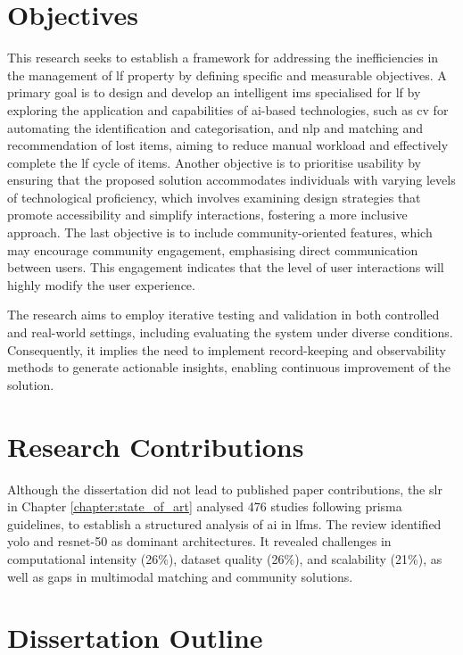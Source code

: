 \section{Objectives} \label{section:objectives}

This research seeks to establish a framework for addressing the inefficiencies in the management of \ac{lf} property by defining specific and measurable objectives. A primary goal is to design and develop an intelligent \ac{ims} specialised for \ac{lf} by exploring the application and capabilities of \ac{ai}-based technologies, such as \ac{cv} for automating the identification and categorisation, and \ac{nlp} and matching and recommendation of lost items, aiming to reduce manual workload and effectively complete the \ac{lf} cycle of items. Another objective is to prioritise usability by ensuring that the proposed solution accommodates individuals with varying levels of technological proficiency, which involves examining design strategies that promote accessibility and simplify interactions, fostering a more inclusive approach. The last objective is to include community-oriented features, which may encourage community engagement, emphasising direct communication between users. This engagement indicates that the level of user interactions will highly modify the user experience.

The research aims to employ iterative testing and validation in both controlled and real-world settings, including evaluating the system under diverse conditions. Consequently, it implies the need to implement record-keeping and observability methods to generate actionable insights, enabling continuous improvement of the solution.

\section{Research Contributions} \label{section:research_contributions}

Although the dissertation did not lead to published paper contributions, the \ac{slr} in Chapter \ref{chapter:state_of_art} analysed 476 studies following \ac{prisma} guidelines, to establish a structured analysis of \ac{ai} in \ac{lfms}. The review identified \ac{yolo} and \ac{resnet}-50 as dominant architectures. It revealed challenges in computational intensity (26\%), dataset quality (26\%), and scalability (21\%), as well as gaps in multimodal matching and community solutions.

\section{Dissertation Outline} \label{section:dissertation_outline}

